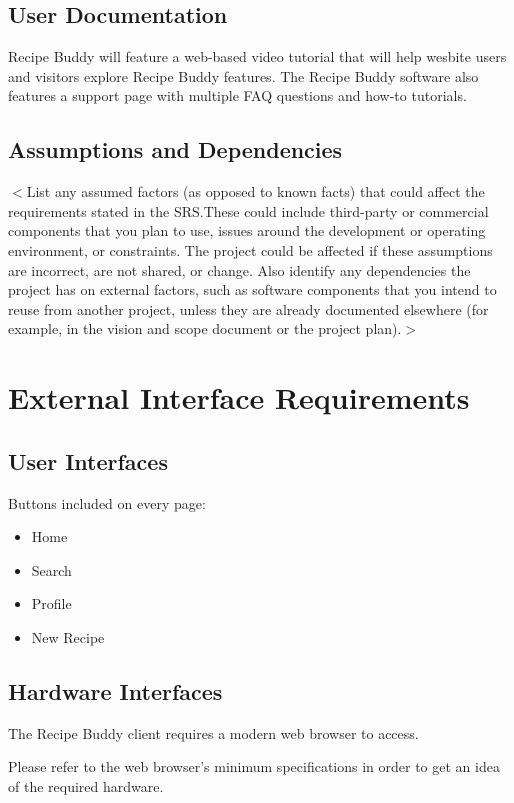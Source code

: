 \documentclass{scrreprt}
\begin{document}
\section{User Documentation}
Recipe Buddy will feature a web-based video tutorial that will help wesbite users and visitors explore Recipe Buddy features. The Recipe Buddy software also features a support page with multiple FAQ questions and how-to tutorials.

\section{Assumptions and Dependencies}

$<$List any assumed factors (as opposed to known facts) that could affect the 
requirements stated in the SRS.\@ These could include third-party or commercial 
components that you plan to use, issues around the development or operating 
environment, or constraints. The project could be affected if these assumptions 
are incorrect, are not shared, or change. Also identify any dependencies the 
project has on external factors, such as software components that you intend to 
reuse from another project, unless they are already documented elsewhere (for 
example, in the vision and scope document or the project plan).$>$

\chapter{External Interface Requirements}

\section{User Interfaces}
Buttons included on every page:
\begin{itemize}
    \item Home
    \item Search
    \item Profile
    \item New Recipe
\end{itemize}

\section{Hardware Interfaces}
The Recipe Buddy client requires a modern web browser to access.

Please refer to the web browser's minimum specifications in order to get an idea of the required hardware.
\end{document}
